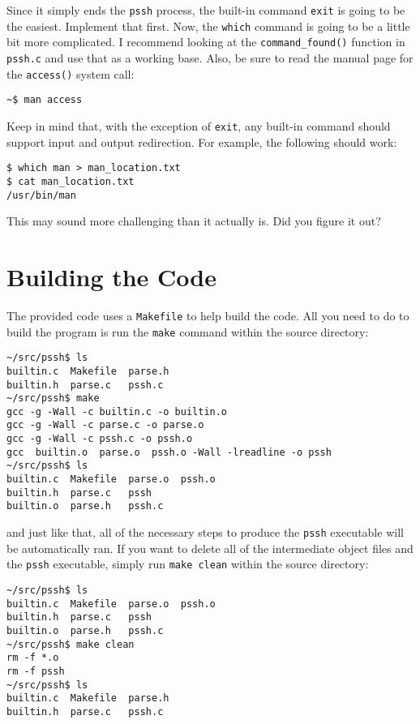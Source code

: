 \documentclass[10pt]{article}
\begin{document}
Since it simply ends the \texttt{pssh} process, the built-in command
\texttt{exit} is going to be the easiest.  Implement that first.  Now,
the \texttt{which} command is going to be a little bit more complicated.
I recommend looking at the \texttt{command\_found()} function in
\texttt{pssh.c} and use that as a working base.  Also, be sure to read
the manual page for the \texttt{access()} system call:

\begin{verbatim}
~$ man access
\end{verbatim}

Keep in mind that, with the exception of \texttt{exit}, any built-in
command should support input and output redirection.  For example, the
following should work:

\begin{verbatim}
$ which man > man_location.txt
$ cat man_location.txt
/usr/bin/man
\end{verbatim}

This may sound more challenging than it actually is.  Did you figure it
out?

\section{Building the Code}

The provided code uses a \texttt{Makefile} to help build the code.  All
you need to do to build the program is run the \texttt{make} command
within the source directory:

\begin{verbatim}
~/src/pssh$ ls
builtin.c  Makefile  parse.h
builtin.h  parse.c   pssh.c
~/src/pssh$ make
gcc -g -Wall -c builtin.c -o builtin.o
gcc -g -Wall -c parse.c -o parse.o
gcc -g -Wall -c pssh.c -o pssh.o
gcc  builtin.o  parse.o  pssh.o -Wall -lreadline -o pssh
~/src/pssh$ ls
builtin.c  Makefile  parse.o  pssh.o
builtin.h  parse.c   pssh
builtin.o  parse.h   pssh.c
\end{verbatim}

and just like that, all of the necessary steps to produce the
\texttt{pssh} executable will be automatically ran.  If you want to
delete all of the intermediate object files and the \texttt{pssh}
executable, simply run \texttt{make clean} within the source directory:

\begin{verbatim}
~/src/pssh$ ls
builtin.c  Makefile  parse.o  pssh.o
builtin.h  parse.c   pssh
builtin.o  parse.h   pssh.c
~/src/pssh$ make clean
rm -f *.o
rm -f pssh
~/src/pssh$ ls
builtin.c  Makefile  parse.h
builtin.h  parse.c   pssh.c
\end{verbatim}
\end{document}
